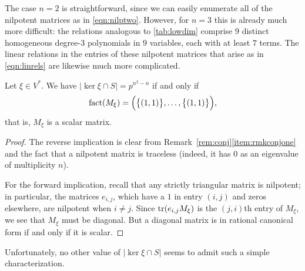 \begin{rem}
The case $n=2$ is straightforward, since we can easily enumerate all of the nilpotent matrices as in \eqref{eqn:nilptwo}. However, for $n=3$ this is already much more difficult: the relations analogous to \eqref{tab:lowdim} comprise $9$ distinct homogeneous degree-$3$ polynomials in $9$ variables, each with at least $7$ terms. The linear relations in the entries of these nilpotent matrices that arise as in \eqref{eqn:linrels} are likewise much more complicated.
\end{rem}

\begin{prop}
Let $\xi\in V^*$. We have $|\ker\xi\cap S|=p^{n^2-n}$ if and only if
\begin{equation*}
\operatorname{fact}(M_\xi)=\Big(\big\{(1,1)\big\},\ldots,\big\{(1,1)\big\}\Big),
\end{equation*}
that is, $M_\xi$ is a scalar matrix.
\end{prop}
\begin{proof}
The reverse implication is clear from Remark~\ref{rem:conj}\eqref{item:rmkconjone} and the fact that a nilpotent matrix is traceless (indeed, it has $0$ as an eigenvalue of multiplicity $n$).

For the forward implication, recall that any strictly triangular matrix is nilpotent; in particular, the matrices $e_{i,j}$, which have a $1$ in entry $(i,j)$ and zeros elsewhere, are nilpotent when $i\ne j$. Since $\operatorname{tr}(e_{i,j}M_\xi)$ is the $(j,i)$th entry of $M_\xi$, we see that $M_\xi$ must be diagonal. But a diagonal matrix is in rational canonical form if and only if it is scalar.
\end{proof}

Unfortunately, no other value of $|\ker\xi\cap S|$ seems to admit such a simple characterization.

